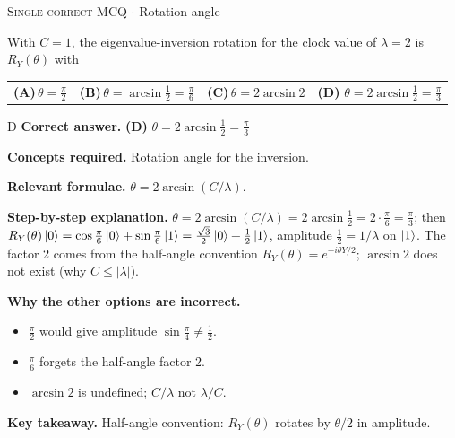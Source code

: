 \documentclass[11pt,a4paper]{article}
\newcommand{\optlabel}[1]{\textbf{(#1)}}
\newcommand{\correctlabel}[1]{\textcolor{okgreen}{\textbf{(#1)}\,\ding{51}}}
\newenvironment{qitem}[1]{\begin{list}{}{\setlength{\leftmargin}{3.3em}\setlength{\labelwidth}{3.1em}%
  \setlength{\labelsep}{0.2em}\setlength{\topsep}{3pt}\setlength{\parsep}{3pt}}\item[\textbf{Q.#1}\hfill]}{\end{list}}
\newcommand{\qsep}{\par\vspace{2pt}{\color{black!15}\hrule}\vspace{4pt}}
\newcommand{\qmeta}[2]{{\footnotesize\color{black!60}\textsc{#1} \;$\cdot$\; #2}\par}
\begin{document}
\begin{qitem}{44}
\qmeta{Single-correct MCQ}{Rotation angle}
With $C = 1$, the eigenvalue-inversion rotation for the clock value of $\lambda = 2$ is $R_Y(\theta)$ with
\par\smallskip\noindent\begin{tabularx}{\linewidth}{@{}*{4}{L}@{}}
\optlabel{A}\,$\theta = \tfrac\pi2$ & \optlabel{B}\,$\theta = \arcsin\tfrac12 = \tfrac\pi6$ & \optlabel{C}\,$\theta = 2\arcsin2$ & \correctlabel{D}\,$\theta = 2\arcsin\tfrac12 = \tfrac\pi3$
\end{tabularx}
\end{qitem}
\begin{solbox}{D}
\textbf{\color{brand}Correct answer.} \textcolor{okgreen}{\textbf{(D)}} $\theta = 2\arcsin\tfrac12 = \tfrac\pi3$

\textbf{\color{brand}Concepts required.} Rotation angle for the inversion.

\textbf{\color{brand}Relevant formulae.} $\theta = 2\arcsin(C/\lambda)$.

\textbf{\color{brand}Step-by-step explanation.} $\theta = 2\arcsin(C/\lambda) = 2\arcsin\tfrac12 = 2\cdot\tfrac\pi6 = \tfrac\pi3$; then $R_Y(\theta)\ket0 = \cos\tfrac\pi6\ket0 + \sin\tfrac\pi6\ket1 = \tfrac{\sqrt3}{2}\ket0 + \tfrac12\ket1$, amplitude $\tfrac12 = 1/\lambda$ on $\ket1$.
The factor 2 comes from the half-angle convention $R_Y(\theta) = e^{-i\theta Y/2}$; $\arcsin 2$ does not exist (why $C \le |\lambda|$).

\textbf{\color{brand}Why the other options are incorrect.}
\begin{itemize}[leftmargin=2.4em, itemsep=1pt, topsep=2pt]
\item[\textbf{(A)}] $\frac\pi2$ would give amplitude $\sin\frac\pi4 \ne \frac12$.
\item[\textbf{(B)}] $\frac\pi6$ forgets the half-angle factor 2.
\item[\textbf{(C)}] $\arcsin 2$ is undefined; $C/\lambda$ not $\lambda/C$.
\end{itemize}
\textbf{\color{brand}Key takeaway.} Half-angle convention: $R_Y(\theta)$ rotates by $\theta/2$ in amplitude.
\end{solbox}
\qsep
\end{document}
